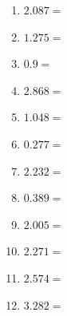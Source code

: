 \documentclass[12pt]{article}
\begin{document}
\begin{enumerate}
\item \large $ 2.087 = $ \vspace{1.5cm}
\item \large $ 1.275 = $ \vspace{1.5cm}
\newpage
\item \large $ 0.9 = $ \vspace{1.5cm}
\item \large $ 2.868 = $ \vspace{1.5cm}
\item \large $ 1.048 = $ \vspace{1.5cm}
\item \large $ 0.277 = $ \vspace{1.5cm}
\item \large $ 2.232 = $ \vspace{1.5cm}
\item \large $ 0.389 = $ \vspace{1.5cm}
\item \large $ 2.005 = $ \vspace{1.5cm}
\item \large $ 2.271 = $ \vspace{1.5cm}
\item \large $ 2.574 = $ \vspace{1.5cm}
\item \large $ 3.282 = $ \vspace{1.5cm}
\end{enumerate}\newpage
\end{document}
